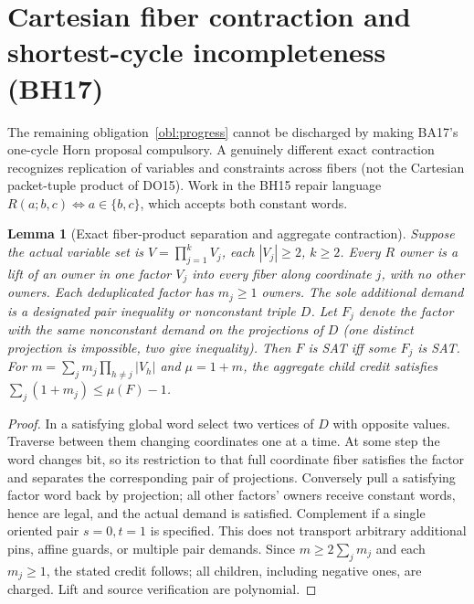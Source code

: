 \documentclass[11pt]{article}
\newtheorem{lemma}[theorem]{Lemma}
\begin{document}
\section{Cartesian fiber contraction and shortest-cycle incompleteness (BH17)}\label{sec:bh17}
The remaining obligation~\ref{obl:progress} cannot be discharged by making BA17's one-cycle Horn proposal compulsory. A genuinely different exact contraction recognizes replication of variables and constraints across fibers (not the Cartesian packet-tuple product of DO15). Work in the BH15 repair language \(R(a;b,c)\iff a\in\{b,c\}\), which accepts both constant words.

\begin{lemma}[Exact fiber-product separation and aggregate contraction]\label{lem:bh17-fiber}
Suppose the actual variable set is \(V=\prod_{j=1}^{k}V_j\), each \(|V_j|\ge2\), \(k\ge2\). Every \(R\) owner is a lift of an owner in one factor \(V_j\) into every fiber along coordinate \(j\), with no other owners. Each deduplicated factor has \(m_j\ge1\) owners. The sole additional demand is a designated pair inequality or nonconstant triple \(D\). Let \(F_j\) denote the factor with the same nonconstant demand on the projections of \(D\) (one distinct projection is impossible, two give inequality). Then \(F\) is SAT iff some \(F_j\) is SAT. For \(m=\sum_j m_j\prod_{h\ne j}|V_h|\) and \(\mu=1+m\), the aggregate child credit satisfies \(\sum_j(1+m_j)\le\mu(F)-1\).
\end{lemma}
\begin{proof}
In a satisfying global word select two vertices of \(D\) with opposite values. Traverse between them changing coordinates one at a time. At some step the word changes bit, so its restriction to that full coordinate fiber satisfies the factor and separates the corresponding pair of projections. Conversely pull a satisfying factor word back by projection; all other factors' owners receive constant words, hence are legal, and the actual demand is satisfied. Complement if a single oriented pair \(s=0,t=1\) is specified. This does not transport arbitrary additional pins, affine guards, or multiple pair demands. Since \(m\ge2\sum_jm_j\) and each \(m_j\ge1\), the stated credit follows; all children, including negative ones, are charged. Lift and source verification are polynomial.
\end{proof}
\end{document}
